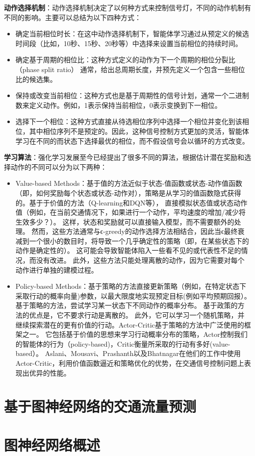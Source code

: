 \textbf{动作选择机制}：动作选择机制决定了以何种方式来控制信号灯，不同的动作机制有不同的影响。主要可以总结为以下四种方式：
\begin{itemize}
    \item 确定当前相位时长：在这中动作选择机制下，智能体学习通过从预定义的候选时间段（比如，10秒、15秒、20秒等）中选择来设置当前相位的持续时间。
    \item 确定基于周期的相位比：这种方式定义的动作为下一个周期的相位分裂比（phase split ratio） 通常，给出总周期长度，并预先定义一个包含一些相位比的候选集。
    \item 保持或改变当前相位：这种方式也是基于周期性的信号计划，通常一个二进制数来定义动作。例如，1表示保持当前相位，0表示变换到下一相位。
    \item 选择下一个相位：这种方式直接从待选相位序列中选择一个相位并变化到该相位，其中相位序列不是预定的。因此，这种信号控制方式更加的灵活，智能体学习在不同的而状态下选择最优的相位，而不假设信号会以循环的方式改变。
\end{itemize}

\textbf{学习算法}：强化学习发展至今已经提出了很多不同的算法，根据估计潜在奖励和选择动作的不同可以分为以下两种：
\begin{itemize}
    \item Value-based Methods：基于值的方法近似于状态-值函数或状态-动作值函数（即，如何奖励每个状态或状态-动作对），策略是从学习的值函数隐式获得的。基于于价值的方法（Q-learning和DQN等）， 直接模拟状态值或状态动作值（例如，在当前交通情况下，如果进行一个动作，平均速度的增加/减少将生效多少？）。 这样，状态和奖励就可以直接输入模型，而不需要额外的处理。 然而，这些方法通常与ϵ-greedy的动作选择方法相结合，因此当ϵ最终衰减到一个很小的数目时，将导致一个几乎确定性的策略（即，在某些状态下的动作是确定性的）。 这可能会导致智能体陷入一些看不见的或代表性不足的情况，而没有改进。 此外，这些方法只能处理离散的动作，因为它需要对每个动作进行单独的建模过程。
    \item Policy-based Methods：基于策略的方法直接更新策略（例如，在特定状态下采取行动的概率向量)参数，以最大限度地实现预定目标(例如平均预期回报）。 基于策略的方法，尝试学习某一状态下不同动作的概率分布。 基于政策的方法的优点是，它不要求行动是离散的。 此外，它可以学习一个随机策略，并继续探索潜在的更有价值的行动。Actor-Critic基于策略的方法中广泛使用的框架之一。 它包括基于价值的思想来学习行动概率分布的策略，Actor控制我们的智能体的行为（policy-based)，Critic衡量所采取的行动有多好(value-based）。 Aslani、Mousavi、Prashanth以及Bhatnagar在他们的工作中使用Actor-Critic，利用价值函数逼近和策略优化的优势，在交通信号控制问题上表现出优异的性能。
\end{itemize}

\section{基于图神经网络的交通流量预测}
\section{图神经网络概述}


